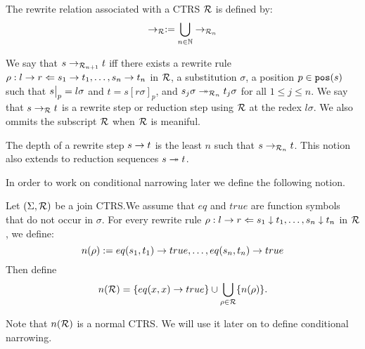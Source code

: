 The rewrite relation associated with a CTRS $\mathcal{R}$ is defined by:
\begin{displaymath}
    \rightarrow_{\mathcal{R}} :=  \bigcup\limits_{n \in \mathbb{N}} \rightarrow_{\mathcal{R}_n}
\end{displaymath}

We say that $s \rightarrow_{\mathcal{R}_{n+1}} t$ iff there exists a rewrite rule $\rho : l \rightarrow r \Leftarrow s_1 \rightarrow t_1, \dots, s_n \rightarrow t_n$ in $\mathcal{R}$, a substitution $\sigma$, a position $p \in \mathtt{pos}(s)$ such that $\restr{s}{p} = l \sigma$ and $t = s[r\sigma]_p$, and $s_j \sigma \twoheadrightarrow_{\mathcal{R}_n} t_j \sigma$ for all $1 \leq j \leq n$. We say that $s \rightarrow_{\mathcal{R}} t$ is a rewrite step or reduction step using $\mathcal{R}$ at the redex $l\sigma$. We also ommits the subscript $\mathcal{R}$ when $\mathcal{R}$ is meaniful.

The depth of a rewrite step $s \rightarrow t$ is the least $n$ such that $s \rightarrow_{\mathcal{R}_n} t$. This notion also extends to reduction sequences $s \twoheadrightarrow t$.

In order to work on conditional narrowing later we define the following notion.
\begin{definition}
    Let $(\Sigma, \mathcal{R})$ be a join CTRS.We assume that $eq$ and $true$ are function symbols that do not occur in $\sigma$. For every rewrite rule $\rho: l \rightarrow r \Leftarrow s_1 \downarrow t_1, \dots, s_n \downarrow t_n$ in $\mathcal{R}$, we define:
    $$n(\rho) := eq(s_1, t_1) \rightarrow true, \dots, eq(s_n, t_n) \rightarrow true$$
    Then define $$n(\mathcal{R}) = \{ eq(x,x) \rightarrow true \} \cup \bigcup\limits_{\rho \in \mathcal{R}} \{ n(\rho) \}.$$
\end{definition}
Note that $n(\mathcal{R})$ is a normal CTRS. We will use it later on to define conditional narrowing.

